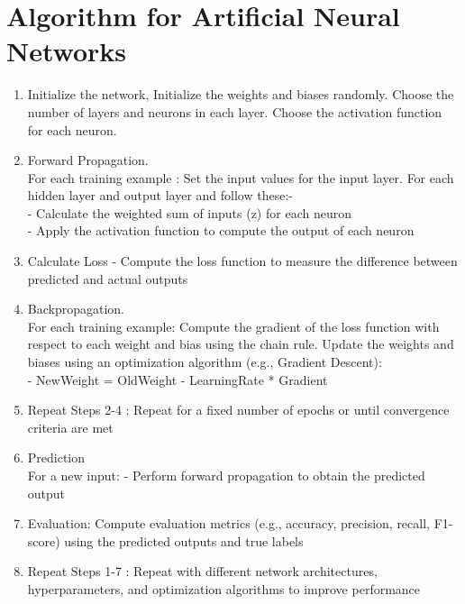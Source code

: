 \documentclass[12pt,a4paper]{report}
\newenvironment{codedstep}[1][]
  {\begin{enumerate}[label=Step \arabic*:]}
  {\end{enumerate}}
\begin{document}
\section{Algorithm for Artificial Neural Networks}
\begin{codedstep}
\item Initialize the network,
Initialize the weights and biases randomly.
Choose the number of layers and neurons in each layer.
Choose the activation function for each neuron.
\item Forward Propagation.\\
For each training example :
    Set the input values for the input layer. 
    For each hidden layer and output layer and follow these:-\\
            - Calculate the weighted sum of inputs (z) for each neuron\\
            - Apply the activation function to compute the output of each neuron
\item Calculate Loss -
Compute the loss function to measure the difference between predicted and actual outputs
\item Backpropagation.\\
For each training example:
    Compute the gradient of the loss function with respect to each weight and bias using the chain rule. Update the weights and biases using an optimization algorithm (e.g., Gradient Descent):\\
        - NewWeight = OldWeight - LearningRate * Gradient
\item Repeat Steps 2-4 :
Repeat for a fixed number of epochs or until convergence criteria are met
\item Prediction\\
For a new input:
    - Perform forward propagation to obtain the predicted output
\item Evaluation:
Compute evaluation metrics (e.g., accuracy, precision, recall, F1-score) using the predicted outputs and true labels
\item Repeat Steps 1-7 :
Repeat with different network architectures, hyperparameters, and optimization algorithms to improve performance
\end{codedstep}
\end{document}

